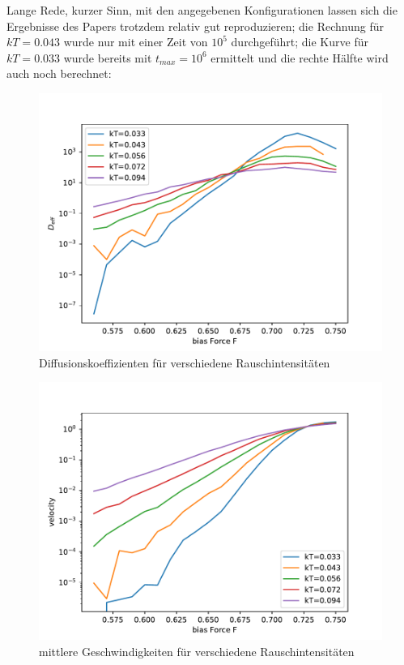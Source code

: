 \documentclass[12pt,a4paper]{article}
\begin{document}
Lange Rede, kurzer Sinn, mit den angegebenen Konfigurationen lassen sich die Ergebnisse des Papers trotzdem relativ gut reproduzieren; die Rechnung für $kT=0.043$ wurde nur mit einer Zeit von $10^5$ durchgeführt; die Kurve für $kT=0.033$ wurde bereits mit $t_{max}=10^6$ ermittelt und die rechte Hälfte wird auch noch berechnet:
\begin{figure}[H]
	\centering
	\includegraphics[scale=0.9]{mechdsh2.pdf} 
	\caption{Diffusionskoeffizienten für verschiedene Rauschintensitäten}
	\label{mdsh}
\end{figure}
\begin{figure}[H]
	\centering
	\includegraphics[scale=0.9]{mechgsh2.pdf} 
	\caption{mittlere Geschwindigkeiten für verschiedene Rauschintensitäten}
	\label{mgsh}
\end{figure}
\end{document}

